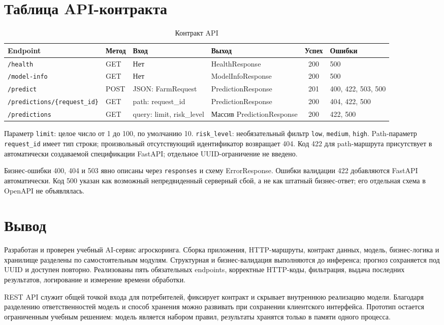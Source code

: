 \documentclass[12pt,a4paper]{article}
\begin{document}
\section{Таблица API-контракта}
\begin{table}[H]
\centering\caption{Контракт API}
\scriptsize
\begin{tabularx}{\textwidth}{|p{3.6cm}|l|p{3.3cm}|X|c|p{1.5cm}|}\hline
Endpoint & Метод & Вход & Выход & Успех & Ошибки \\\hline
\texttt{/health} & GET & Нет & HealthResponse & 200 & 500 \\\hline
\texttt{/model-info} & GET & Нет & ModelInfoResponse & 200 & 500 \\\hline
\texttt{/predict} & POST & JSON: FarmRequest & PredictionResponse & 201 & 400, 422, 503, 500 \\\hline
\texttt{/predictions/}\newline\texttt{\{request\_id\}} & GET & path: request\_id & PredictionResponse & 200 & 404, 422, 500 \\\hline
\texttt{/predictions} & GET & query: limit, risk\_level & Массив PredictionResponse & 200 & 422, 500 \\\hline
\end{tabularx}
\end{table}
Параметр \texttt{limit}: целое число от 1 до 100, по умолчанию 10. \texttt{risk\_level}: необязательный фильтр \texttt{low}, \texttt{medium}, \texttt{high}. Path-параметр \texttt{request\_id} имеет тип строки; произвольный отсутствующий идентификатор возвращает 404. Код 422 для path-маршрута присутствует в автоматически создаваемой спецификации FastAPI; отдельное UUID-ограничение не введено.

Бизнес-ошибки 400, 404 и 503 явно описаны через \texttt{responses} и схему ErrorResponse. Ошибки валидации 422 добавляются FastAPI автоматически. Код 500 указан как возможный непредвиденный серверный сбой, а не как штатный бизнес-ответ; его отдельная схема в OpenAPI не объявлялась.

\section{Вывод}
Разработан и проверен учебный AI-сервис агроскоринга. Сборка приложения, HTTP-маршруты, контракт данных, модель, бизнес-логика и хранилище разделены по самостоятельным модулям. Структурная и бизнес-валидация выполняются до инференса; прогноз сохраняется под UUID и доступен повторно. Реализованы пять обязательных endpoints, корректные HTTP-коды, фильтрация, выдача последних результатов, логирование и измерение времени обработки.

REST API служит общей точкой входа для потребителей, фиксирует контракт и скрывает внутреннюю реализацию модели. Благодаря разделению ответственностей модель и способ хранения можно развивать при сохранении клиентского интерфейса. Прототип остается ограниченным учебным решением: модель является набором правил, результаты хранятся только в памяти одного процесса.
\end{document}
